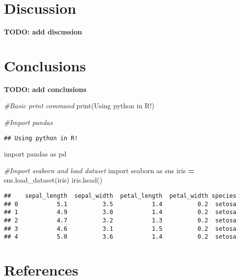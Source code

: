 \documentclass[]{elsarticle} %
\newenvironment{Shaded}{\begin{snugshade}}{\end{snugshade}}
\newcommand{\BuiltInTok}[1]{#1}
\newcommand{\CommentTok}[1]{\textcolor[rgb]{0.56,0.35,0.01}{\textit{#1}}}
\newcommand{\ImportTok}[1]{#1}
\newcommand{\NormalTok}[1]{#1}
\newcommand{\OperatorTok}[1]{\textcolor[rgb]{0.81,0.36,0.00}{\textbf{#1}}}
\newcommand{\StringTok}[1]{\textcolor[rgb]{0.31,0.60,0.02}{#1}}
\begin{document}
\hypertarget{discussion}{%
\section{Discussion}\label{discussion}}

\textbf{TODO: add discussion}

\hypertarget{conclusions}{%
\section{Conclusions}\label{conclusions}}

\textbf{TODO: add conclusions}

\begin{Shaded}
\begin{Highlighting}[]

\CommentTok{\#Basic print command}
\BuiltInTok{print}\NormalTok{(}\StringTok{\textquotesingle{}Using python in R!\textquotesingle{}}\NormalTok{)}

\CommentTok{\#Import pandas}
\end{Highlighting}
\end{Shaded}

\begin{verbatim}
## Using python in R!
\end{verbatim}

\begin{Shaded}
\begin{Highlighting}[]
\ImportTok{import}\NormalTok{ pandas }\ImportTok{as}\NormalTok{ pd}

\CommentTok{\#Import seaborn and load dataset}
\ImportTok{import}\NormalTok{ seaborn }\ImportTok{as}\NormalTok{ sns}
\NormalTok{iris }\OperatorTok{=}\NormalTok{ sns.load\_dataset(}\StringTok{\textquotesingle{}iris\textquotesingle{}}\NormalTok{)}
\NormalTok{iris.head()}
\end{Highlighting}
\end{Shaded}

\begin{verbatim}
##    sepal_length  sepal_width  petal_length  petal_width species
## 0           5.1          3.5           1.4          0.2  setosa
## 1           4.9          3.0           1.4          0.2  setosa
## 2           4.7          3.2           1.3          0.2  setosa
## 3           4.6          3.1           1.5          0.2  setosa
## 4           5.0          3.6           1.4          0.2  setosa
\end{verbatim}

\hypertarget{references}{%
\section*{References}\label{references}}
\end{document}
